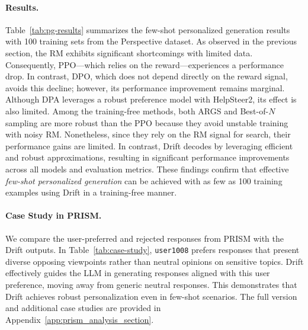 

\paragraph{Results.}
Table~\ref{tab:pg-results} summarizes the few-shot personalized generation results with 100 training sets from the Perspective dataset. As observed in the previous section, the RM exhibits significant shortcomings with limited data. Consequently, PPO—which relies on the reward—experiences a performance drop. In contrast, DPO, which does not depend directly on the reward signal, avoids this decline; however, its performance improvement remains marginal. Although DPA leverages a robust preference model with HelpSteer2, its effect is also limited.
Among the training-free methods, both ARGS and Best-of-$N$ sampling are more robust than the PPO because they avoid unstable training with noisy RM. Nonetheless, since they rely on the RM signal for search, their performance gains are limited.
In contrast, Drift decodes by leveraging efficient and robust approximations, resulting in significant performance improvements across all models and evaluation metrics. These findings confirm that effective \textit{few-shot personalized generation} can be achieved with as few as 100 training examples using Drift in a training-free manner.

\paragraph{Case Study in PRISM.}
We compare the user-preferred and rejected responses from PRISM with the Drift outputs. In Table~\ref{tab:case-study}, \texttt{user1008} prefers responses that present diverse opposing viewpoints rather than neutral opinions on sensitive topics. Drift effectively guides the LLM in generating responses aligned with this user preference, moving away from generic neutral responses. This demonstrates that Drift achieves robust personalization even in few-shot scenarios. The full version and additional case studies are provided in Appendix~\ref{app:prism_analysis_section}.


